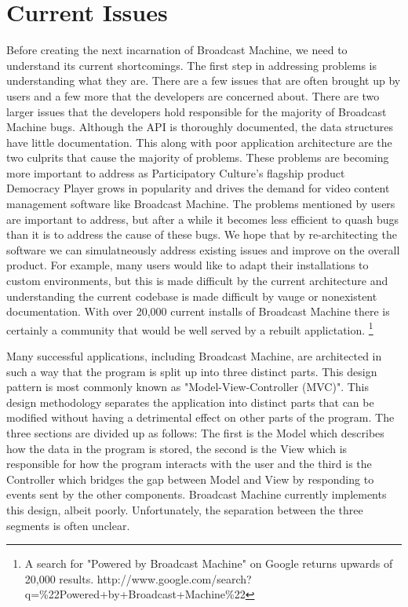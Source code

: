 \documentclass[a4paper,12pt]{report}
\begin{document}
\chapter{Current Issues}
Before creating the next incarnation of Broadcast Machine, we need to understand its current shortcomings.
The first step in addressing problems is understanding what they are.
There are a few issues that are often brought up by users and a few more that the developers are concerned about.
There are two larger issues that the developers hold responsible for the majority of Broadcast Machine bugs.
Although the API is thoroughly documented, the data structures have little documentation.
This along with poor application architecture are the two culprits that cause the majority of problems.
These problems are becoming more important to address as Participatory Culture's flagship product Democracy Player grows in popularity and drives the demand for video content management software like Broadcast Machine.
The problems mentioned by users are important to address, but after a while it becomes less efficient to quash bugs than it is to address the cause of these bugs.
We hope that by re-architecting the software we can simulatneously address existing issues and improve on the overall product.
For example, many users would like to adapt their installations to custom environments, but this is made difficult by the current architecture and understanding the current codebase is made difficult by vauge or nonexistent documentation.
With over 20,000 current installs of Broadcast Machine there is certainly a community that would be well served by a rebuilt applictation. \footnote{A search for "Powered by Broadcast Machine" on Google returns upwards of 20,000 results.  http://www.google.com/search?q=\%22Powered+by+Broadcast+Machine\%22}


Many successful applications, including Broadcast Machine, are architected in such a way that the program is split up into three distinct parts.
This design pattern is most commonly known as "Model-View-Controller (MVC)".
This design methodology separates the application into distinct parts that can be modified without having a detrimental effect on other parts of the program.
The three sections are divided up as follows: The first is the Model which describes how the data in the program is stored, the second is the View which is responsible for how the program interacts with the user and the third is the Controller which bridges the gap between Model and View by responding to events sent by the other components. 
Broadcast Machine currently implements this design, albeit poorly. 
Unfortunately, the separation between the three segments is often unclear. 
\end{document}
